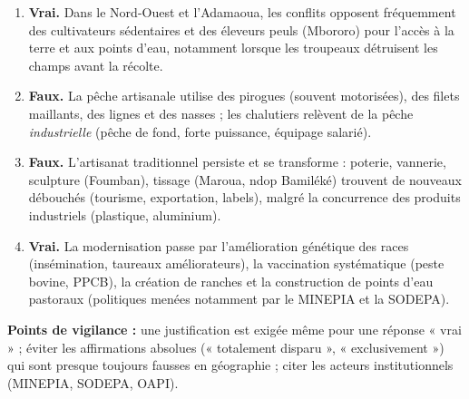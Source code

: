 \documentclass[11pt]{article}
\begin{document}
\begin{corrige}
\begin{enumerate}
\item \textbf{Vrai.} Dans le Nord-Ouest et l'Adamaoua, les conflits opposent fréquemment des cultivateurs sédentaires et des éleveurs peuls (Mbororo) pour l'accès à la terre et aux points d'eau, notamment lorsque les troupeaux détruisent les champs avant la récolte.
\item \textbf{Faux.} La pêche artisanale utilise des pirogues (souvent motorisées), des filets maillants, des lignes et des nasses ; les chalutiers relèvent de la pêche \emph{industrielle} (pêche de fond, forte puissance, équipage salarié).
\item \textbf{Faux.} L'artisanat traditionnel persiste et se transforme : poterie, vannerie, sculpture (Foumban), tissage (Maroua, ndop Bamiléké) trouvent de nouveaux débouchés (tourisme, exportation, labels), malgré la concurrence des produits industriels (plastique, aluminium).
\item \textbf{Vrai.} La modernisation passe par l'amélioration génétique des races (insémination, taureaux améliorateurs), la vaccination systématique (peste bovine, PPCB), la création de ranches et la construction de points d'eau pastoraux (politiques menées notamment par le MINEPIA et la SODEPA).
\end{enumerate}
\textbf{Points de vigilance :} une justification est exigée même pour une réponse « vrai » ; éviter les affirmations absolues (« totalement disparu », « exclusivement ») qui sont presque toujours fausses en géographie ; citer les acteurs institutionnels (MINEPIA, SODEPA, OAPI).
\end{corrige}
\end{document}
